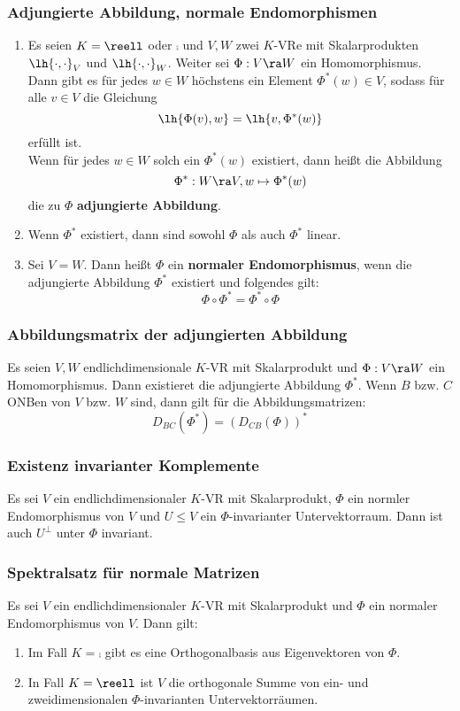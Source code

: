 \documentclass{kit}
\begin{document}
    \subsubsection{Adjungierte Abbildung, normale Endomorphismen}
      \begin{enumerate}
        \item Es seien $K=\reell$ oder $\comp$ und $V,W$ zwei $K$-VRe mit Skalarprodukten $\lh{\cdot,\cdot}_V$ und
          $\lh{\cdot,\cdot}_W$. Weiter sei $\Phi:V\ra W$ ein Homomorphismus. Dann gibt es für jedes $w\in W$ höchstens ein
          Element $\Phi^*(w)\in V$, sodass für alle $v\in V$ die Gleichung
          $$\lh{\Phi(v),w}=\lh{v,\Phi^*(w)}$$
          erfüllt ist.\\
          Wenn für jedes $w\in W$ solch ein $\Phi^*(w)$ existiert, dann heißt die Abbildung
          $$\Phi^*:W\ra V,w\mapsto\Phi^*(w)$$
          die zu $\Phi$ \textbf{adjungierte Abbildung}. 
        \item Wenn $\Phi^*$ existiert, dann sind sowohl $\Phi$ als auch $\Phi^*$ linear.
        \item Sei $V=W$. Dann heißt $\Phi$ ein \textbf{normaler Endomorphismus}, wenn die adjungierte Abbildung $\Phi^*$
          existiert und folgendes gilt:
          $$\Phi\circ\Phi^*=\Phi^*\circ\Phi$$
      \end{enumerate}
    \subsubsection{Abbildungsmatrix der adjungierten Abbildung}
      Es seien $V,W$ endlichdimensionale $K$-VR mit Skalarprodukt und $\Phi:V\ra W$ ein Homomorphismus. Dann existieret die
      adjungierte Abbildung $\Phi^*$. Wenn $B$ bzw. $C$ ONBen von $V$ bzw. $W$ sind, dann gilt für die Abbildungsmatrizen:
      $$D_{BC}(\Phi^*)=(D_{CB}(\Phi))^*$$
    \subsubsection{Existenz invarianter Komplemente}
      Es sei $V$ ein endlichdimensionaler $K$-VR mit Skalarprodukt, $\Phi$ ein normler Endomorphismus von $V$ und $U\le V$
      ein $\Phi$-invarianter Untervektorraum. Dann ist auch $U^\perp$ unter $\Phi$ invariant.
    \subsubsection{Spektralsatz für normale Matrizen}
      Es sei $V$ ein endlichdimensionaler $K$-VR mit Skalarprodukt und $\Phi$ ein normaler Endomorphismus von $V$. Dann
      gilt:
      \begin{enumerate}
        \item Im Fall $K=\comp$ gibt es eine Orthogonalbasis aus Eigenvektoren von $\Phi$.
        \item In Fall $K=\reell$ ist $V$ die orthogonale Summe von ein- und zweidimensionalen $\Phi$-invarianten
          Untervektorräumen.
      \end{enumerate}
\end{document}
